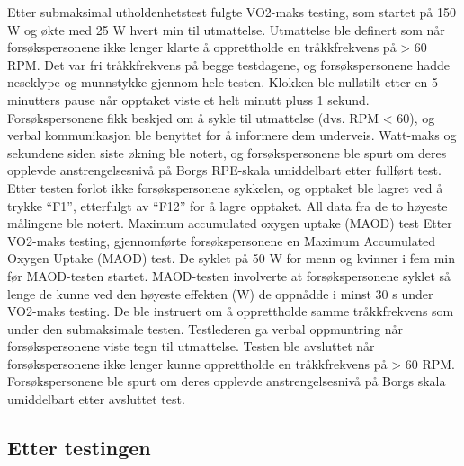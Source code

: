 \documentclass[
  letterpaper,
  DIV=11,
  numbers=noendperiod]{scrreprt}
\begin{document}
Etter submaksimal utholdenhetstest fulgte VO2-maks testing, som startet
på 150 W og økte med 25 W hvert min til utmattelse. Utmattelse ble
definert som når forsøkspersonene ikke lenger klarte å opprettholde en
tråkkfrekvens på \textgreater{} 60 RPM. Det var fri tråkkfrekvens på
begge testdagene, og forsøkspersonene hadde neseklype og munnstykke
gjennom hele testen. Klokken ble nullstilt etter en 5 minutters pause
når opptaket viste et helt minutt pluss 1 sekund. Forsøkspersonene fikk
beskjed om å sykle til utmattelse (dvs. RPM \textless{} 60), og verbal
kommunikasjon ble benyttet for å informere dem underveis. Watt-maks og
sekundene siden siste økning ble notert, og forsøkspersonene ble spurt
om deres opplevde anstrengelsesnivå på Borgs RPE-skala umiddelbart etter
fullført test. Etter testen forlot ikke forsøkspersonene sykkelen, og
opptaket ble lagret ved å trykke ``F1'', etterfulgt av ``F12'' for å
lagre opptaket. All data fra de to høyeste målingene ble notert. Maximum
accumulated oxygen uptake (MAOD) test Etter VO2-maks testing,
gjennomførte forsøkspersonene en Maximum Accumulated Oxygen Uptake
(MAOD) test. De syklet på 50 W for menn og kvinner i fem min før
MAOD-testen startet. MAOD-testen involverte at forsøkspersonene syklet
så lenge de kunne ved den høyeste effekten (W) de oppnådde i minst 30 s
under VO2-maks testing. De ble instruert om å opprettholde samme
tråkkfrekvens som under den submaksimale testen. Testlederen ga verbal
oppmuntring når forsøkspersonene viste tegn til utmattelse. Testen ble
avsluttet når forsøkspersonene ikke lenger kunne opprettholde en
tråkkfrekvens på \textgreater{} 60 RPM. Forsøkspersonene ble spurt om
deres opplevde anstrengelsesnivå på Borgs skala umiddelbart etter
avsluttet test.

\hypertarget{etter-testingen}{%
\subsection{Etter testingen}\label{etter-testingen}}
\end{document}

